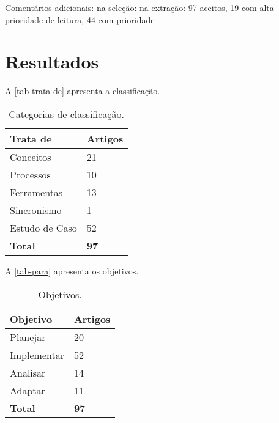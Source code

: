 \documentclass[
article,			%
11pt,				%
oneside,			%
a4paper,			%
english,			%
brazil,				%
sumario=tradicional
]{abntex2}
\begin{document}
  Comentários adicionais: na seleção: na extração: 97 aceitos, 19 com alta prioridade de leitura, 44 com prioridade

  \section{Resultados}

  A \autoref{tab-trata-de} apresenta a classificação.

  \begin{table}[htb]
    \ABNTEXfontereduzida
    \caption[Categorias de classificação]{Categorias de classificação.}
    \label{tab-trata-de}
    \begin{center}
      \begin{tabular}{p{3.0cm}|p{2.0cm}}
        \textbf{Trata de} & \textbf{Artigos} \\
        \hline
        Conceitos & 21 \\
        \hline
        Processos & 10 \\
        \hline
        Ferramentas & 13\\
        \hline
        Sincronismo & 1\\
        \hline
        Estudo de Caso & 52\\
        \hline
        \textbf{Total} & \textbf{97} \\
      \end{tabular}
    \end{center}
  \end{table}

  A \autoref{tab-para} apresenta os objetivos.

  \begin{table}[htb]
    \ABNTEXfontereduzida
    \caption[Objetivos]{Objetivos.}
    \label{tab-para}
    \begin{center}
      \begin{tabular}{p{3.0cm}|p{2.0cm}}
        \textbf{Objetivo} & \textbf{Artigos} \\
        \hline
        Planejar & 20 \\
        \hline
        Implementar & 52 \\
        \hline
        Analisar & 14 \\
        \hline
        Adaptar & 11 \\
        \hline
        \textbf{Total} & \textbf{97} \\
      \end{tabular}
    \end{center}
  \end{table}
\end{document}
